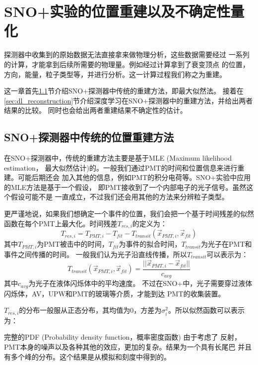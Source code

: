 \chapter{SNO+实验的位置重建以及不确定性量化}

探测器中收集到的原始数据无法直接拿来做物理分析，这些数据需要经过
一系列的计算，才能拿到后续所需要的物理量。例如经过计算拿到了衰变顶点
的位置，方向，能量，粒子类型等，并进行分析。这一计算过程我们称之为重建。

这一章首先\ref{sec:classical_reconstruction}节介绍SNO+探测器中传统的重建方法，即最大似然法。
接着在\ref{sec:dl_reconstruction}节介绍深度学习在SNO+探测器中的重建方法，并给出两者结果的比较。
同时也会给出两者重建结果不确定性的估计。

\section{SNO+探测器中传统的位置重建方法}\label{sec:classical_reconstruction}

在SNO+探测器中，传统的重建方法主要是基于MLE (Maximum likelihood estimation，
最大似然估计)的。一般我们通过PMT的时间和位置信息来进行重建。可能后期还会
加入其他的信息，例如PMT的积分电荷等。SNO+实验中应用的MLE方法是基于一个假设，
即PMT接收到了一个内部电子的光子信号\cite{anderson2024}。虽然这个假设可能不是
一直成立，不过我们还会用其他的方法来分辨粒子类型。

更严谨地说，如果我们想确定一个事件的位置，我们会把一个基于时间残差的似然
函数在每个PMT上最大化。时间残差$T_{res,i}$的定义为：
\begin{equation}
T_{res,i} = T_{PMT,i}-T_{fit}-T_{transit}(\vec{x}_{PMT,i},\vec{x}_{fit})
\label{eq:residual}
\end{equation}
其中$T_{PMT,i}$为PMT被击中的时间，$T_{fit}$为事件的拟合时间，$T_{transit}$为光子在PMT和事件之间传播的时间。
一般我们认为光子沿直线传播，所以$T_{transit}$可以表示为：
\begin{equation}
T_{transit}(\vec{x}_{PMT,i},\vec{x}_{fit}) = \frac{||\vec{x}_{PMT,i}-\vec{x}_{fit}||}{c_{avg}}
\end{equation}
其中$c_{avg}$为光子在液体闪烁体中的平均速度。
不过在SNO+中，光子需要穿过液体闪烁体，AV，UPW和PMT的玻璃等介质，才能到达
PMT的收集装置。

$T_{res,i}$的分布一般服从正态分布，其均值为0，方差为$\sigma_{i}^2$。所以似然函数可以表示为：

完整的PDF (Probability density function，概率密度函数) 由于考虑了
反射，PMT本身的噪声以及各种其他的效应，更加的复杂。结果为一个具有长尾巴
并且有多个峰的分布。这个结果是从模拟和刻度中得到的\cite{anderson2024}。

